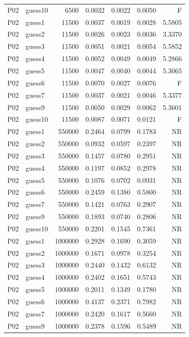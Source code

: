 {\begin{longtable}{llrrrrr}
P02 & guess10 & 6500 & 0.0032 & 0.0022 & 0.0050 & F \\
P02 & guess1 & 11500 & 0.0037 & 0.0019 & 0.0028 & 5.5805 \\
P02 & guess2 & 11500 & 0.0026 & 0.0023 & 0.0036 & 3.3370 \\
P02 & guess3 & 11500 & 0.0051 & 0.0021 & 0.0054 & 5.5852 \\
P02 & guess4 & 11500 & 0.0052 & 0.0049 & 0.0049 & 5.2866 \\
P02 & guess5 & 11500 & 0.0047 & 0.0040 & 0.0044 & 5.3065 \\
P02 & guess6 & 11500 & 0.0070 & 0.0027 & 0.0076 & F \\
P02 & guess7 & 11500 & 0.0037 & 0.0021 & 0.0046 & 5.3377 \\
P02 & guess9 & 11500 & 0.0050 & 0.0029 & 0.0062 & 5.3601 \\
P02 & guess10 & 11500 & 0.0087 & 0.0071 & 0.0121 & F \\
P02 & guess1 & 550000 & 0.2464 & 0.0799 & 0.1783 & NR \\
P02 & guess2 & 550000 & 0.0932 & 0.0597 & 0.2397 & NR \\
P02 & guess3 & 550000 & 0.1457 & 0.0780 & 0.2951 & NR \\
P02 & guess4 & 550000 & 0.1197 & 0.0852 & 0.2978 & NR \\
P02 & guess5 & 550000 & 0.1076 & 0.0702 & 0.0931 & NR \\
P02 & guess6 & 550000 & 0.2459 & 0.1380 & 0.5800 & NR \\
P02 & guess7 & 550000 & 0.1421 & 0.0763 & 0.2907 & NR \\
P02 & guess9 & 550000 & 0.1893 & 0.0740 & 0.2806 & NR \\
P02 & guess10 & 550000 & 0.2201 & 0.1545 & 0.7361 & NR \\
P02 & guess1 & 1000000 & 0.2928 & 0.1690 & 0.3059 & NR \\
P02 & guess2 & 1000000 & 0.1671 & 0.0978 & 0.3254 & NR \\
P02 & guess3 & 1000000 & 0.2440 & 0.1432 & 0.6132 & NR \\
P02 & guess4 & 1000000 & 0.2402 & 0.1651 & 0.5743 & NR \\
P02 & guess5 & 1000000 & 0.2011 & 0.1349 & 0.1780 & NR \\
P02 & guess6 & 1000000 & 0.4137 & 0.2371 & 0.7982 & NR \\
P02 & guess7 & 1000000 & 0.2420 & 0.1617 & 0.5660 & NR \\
P02 & guess9 & 1000000 & 0.2378 & 0.1596 & 0.5489 & NR \\

\end{longtable}}
